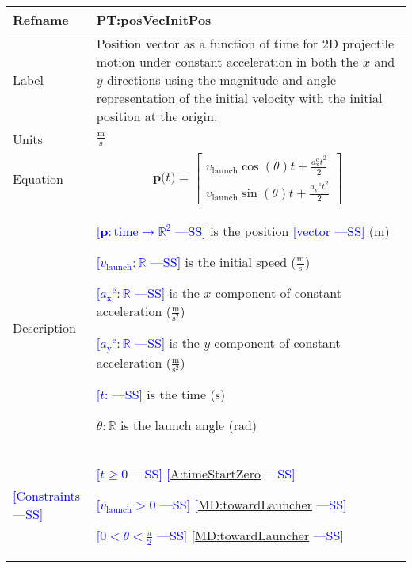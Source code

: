 \documentclass[12pt]{article}
\newcommand{\authornote}[3]{\textcolor{#1}{[#3 ---#2]}}
\newcommand{\authornote}[3]{}
\newcommand{\wss}[1]{\authornote{blue}{SS}{#1}}
\begin{document}
\noindent \begin{minipage}{\textwidth}
\begin{tabular}{>{\raggedright}p{}>{\raggedright\arraybackslash}p{}}
\toprule \textbf{Refname} & \textbf{PT:posVecInitPos} 
\label{PT:posVecInitPos} \\ \midrule Label & Position vector as a function of
time for 2D projectile motion under constant acceleration in both the $x$ and
$y$ directions using the magnitude and angle representation of the initial
velocity with the initial position at the origin.
        
\\ \midrule
Units & $\frac{\text{m}}{\text{s}}$
        
\\ \midrule
Equation & \begin{displaymath}
           \symbf{p}\text{(}t\text{)}=\begin{bmatrix}
                                      {v}_{\text{launch}} \cos(\theta) t +\frac{a_\text{x}^\text{c} t^2}{2}\\
                                      {v}_{\text{launch}} \sin(\theta) t +\frac{{{a_{\text{y}}}^{\text{c}}} t^{2}}{2}
                                      \end{bmatrix}
           \end{displaymath}
\\ \midrule
Description & \begin{symbDescription}
              \item{\wss{$\symbf{p}: \text{time} \rightarrow \mathbb{R}^2$} is the position \wss{vector} (${\text{m}}$)}
              \item{\wss{${{v}_{\text{launch}}}: \mathbb{R}$} is the initial speed ($\frac{\text{m}}{\text{s}}$)}
              \item{\wss{${{a_{\text{x}}}^{\text{c}}}: \mathbb{R}$} is the $x$-component of constant acceleration ($\frac{\text{m}}{\text{s}^{2}}$)}
              \item{\wss{${{a_{\text{y}}}^{\text{c}}}: \mathbb{R}$} is the $y$-component of constant acceleration ($\frac{\text{m}}{\text{s}^{2}}$)}
              \item{\wss{$t$: \text{time}} is the time (${\text{s}}$)}
              \item $\theta: \mathbb{R}$ is the launch angle (rad)
              \end{symbDescription}

\\ \midrule
\wss{Constraints} & 
\begin{symbDescription}
\item \wss{$t \geq 0$} \wss{\hyperref[timeStartZero]{A:timeStartZero}}
\item \wss{$v_\text{launch} > 0$} \wss{\hyperref[MD:towardLauncher]{MD:towardLauncher}}
\item \wss{$
0 < \theta < \frac{\pi}{2}$} \wss{\hyperref[MD:towardLauncher]{MD:towardLauncher}}
\end{symbDescription}


\end{tabular}
\end{minipage}
\end{document}
